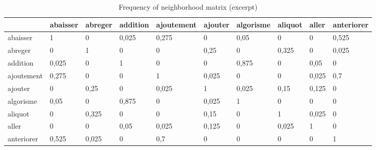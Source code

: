 \documentclass{elsarticle}
\begin{document}
\begin{table}
\begin{tabular}{|l|l|l|l|l|l|l|l|l|l|}
\hline
 & abaisser & abreger & addition & ajoutement & ajouter & algorisme & aliquot & aller & anteriorer \\ \hline
abaisser  & \cellcolor{gris} 1 & 0 & \cellcolor{grisclair} 0,025 & \cellcolor{gris} 0,275 & 0 & \cellcolor{grisclair} 0,05 & 0 & 0 & \cellcolor{gris} 0,525\\ \hline
abreger & 0 & \cellcolor{gris} 1 & 0 & 0 & \cellcolor{gris} 0,25 & 0 & \cellcolor{gris} 0,325 & 0 & \cellcolor{grisclair} 0,025\\ \hline
addition & \cellcolor{grisclair} 0,025 & 0 & \cellcolor{gris} 1 & 0 & 0 & \cellcolor{gris} 0,875 & 0 & \cellcolor{grisclair} 0,05 & 0\\ \hline
ajoutement  & \cellcolor{gris} 0,275 & 0 & 0 & \cellcolor{gris} 1 & \cellcolor{grisclair} 0,025 & 0 & 0 & \cellcolor{grisclair} 0,025 & \cellcolor{gris} 0,7\\ \hline
ajouter & 0 & \cellcolor{gris} 0,25 & 0 & \cellcolor{grisclair} 0,025 & \cellcolor{gris} 1 & \cellcolor{grisclair} 0,025 & \cellcolor{grisclair} 0,15 & \cellcolor{grisclair} 0,125 & 0\\ \hline
algorisme & \cellcolor{grisclair} 0,05 & 0 & \cellcolor{gris} 0,875 & 0 & \cellcolor{grisclair} 0,025 & \cellcolor{gris} 1 & 0 & 0 & 0\\ \hline
aliquot & 0 & \cellcolor{gris} 0,325 & 0 & 0 & \cellcolor{grisclair} 0,15 & 0 & \cellcolor{gris} 1 & \cellcolor{grisclair} 0,025 & 0\\ \hline
aller & 0 & 0 & \cellcolor{grisclair} 0,05 & \cellcolor{grisclair} 0,025 & \cellcolor{grisclair} 0,125 & 0 & \cellcolor{grisclair} 0,025 & \cellcolor{gris} 1 & 0\\ \hline
anteriorer & \cellcolor{gris} 0,525 & \cellcolor{grisclair} 0,025 & 0 & \cellcolor{gris} 0,7 & 0 & 0 & 0 & 0 & \cellcolor{gris} 1 \\ \hline
\end{tabular}

\caption{Frequency of neighborhood matrix (excerpt)}
\label{bertin1}
\end{table}
\end{document}

